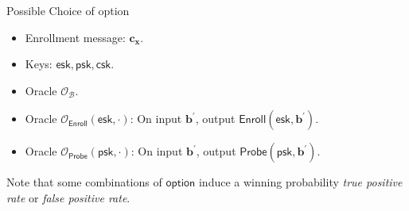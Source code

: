\begin{frame}{Possible Choice of \textsf{option}}

\begin{itemize}
	
	\item Enrollment message: $\mathbf{c_x}$.
	\pause

	\item Keys: $\textsf{esk}, \textsf{psk}, \textsf{csk}$.
	\pause

	\item Oracle $\mathcal{O}_{\mathcal{B}}$.
	\pause
	
	\item Oracle $\mathcal{O}_{\textsf{Enroll}} (\textsf{esk}, \cdot)$: On input $\mathbf{b}^\prime$, output $\textsf{Enroll}(\textsf{esk}, \mathbf{b}^\prime)$.
	\pause

	\item Oracle $\mathcal{O}_{\textsf{Probe}} (\textsf{psk}, \cdot)$: On input $\mathbf{b}^\prime$, output $\textsf{Probe}(\textsf{psk}, \mathbf{b}^\prime)$.
	
\end{itemize}
\medskip
\pause

Note that some combinations of $\textsf{option}$ induce a winning probability \emph{true positive rate} or \emph{false positive rate}.

\end{frame}


